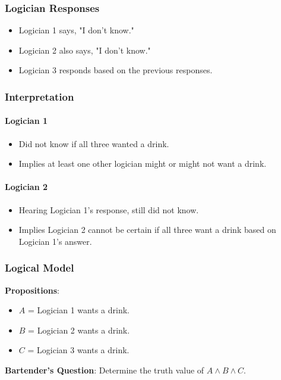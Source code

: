 \documentclass{article}
\begin{document}
\subsubsection{Logician Responses}
\begin{itemize}
    \item Logician 1 says, "I don't know."
    \item Logician 2 also says, "I don't know."
    \item Logician 3 responds based on the previous responses.
\end{itemize}

\subsubsection{Interpretation}
\paragraph{Logician 1}
\begin{itemize}
    \item Did not know if all three wanted a drink.
    \item Implies at least one other logician might or might not want a drink.
\end{itemize}

\paragraph{Logician 2}
\begin{itemize}
    \item Hearing Logician 1's response, still did not know.
    \item Implies Logician 2 cannot be certain if all three want a drink based on Logician 1's answer.
\end{itemize}

\subsubsection{Logical Model}

\textbf{Propositions}:
\begin{itemize}
    \item $A$ = Logician 1 wants a drink.
    \item $B$ = Logician 2 wants a drink.
    \item $C$ = Logician 3 wants a drink.
\end{itemize}

\textbf{Bartender's Question}: Determine the truth value of $A \land B \land C$.
\end{document}
